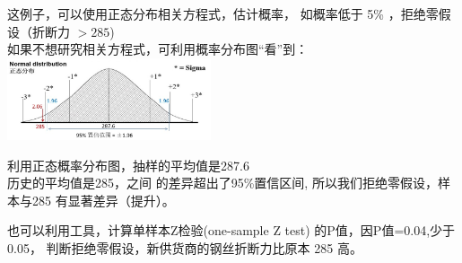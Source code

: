 这例子，可以使用正态分布相关方程式，估计概率， 如概率低于 5\%
，拒绝零假设（折断力 \(> 285\)) \\
如果不想研究相关方程式，可利用概率分布图``看''到：\\

\includegraphics[width=6cm]{M4SingleMean1Screenshot_2022-09-11_201026.jpg}

利用正态概率分布图，抽样的平均值是287.6\\
历史的平均值是285，之间 的差异超出了95\%置信区间,
所以我们拒绝零假设，样本与285 有显著差异（提升）。

也可以利用工具，计算单样本Z检验(one-sample Z test)
的P值，因P值=0.04,少于0.05， 判断拒绝零假设，新供货商的钢丝折断力比原本
285 高。


